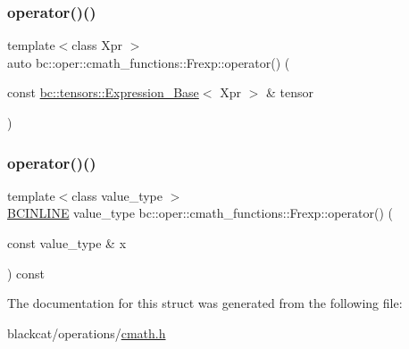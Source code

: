 \mbox{\label{structbc_1_1oper_1_1cmath__functions_1_1Frexp_aaba2f5528d6ad335863154f6976d800a}} 
\subsubsection{\texorpdfstring{operator()()}{operator()()}\hspace{0.1cm}{\footnotesize\ttfamily [2/3]}}
{\footnotesize\ttfamily template$<$class Xpr $>$ \\
auto bc\+::oper\+::cmath\+\_\+functions\+::\+Frexp\+::operator() (\begin{DoxyParamCaption}\item[{const \hyperlink{classbc_1_1tensors_1_1Expression__Base}{bc\+::tensors\+::\+Expression\+\_\+\+Base}$<$ Xpr $>$ \&}]{tensor }\end{DoxyParamCaption})\hspace{0.3cm}{\ttfamily [inline]}}

\mbox{\label{structbc_1_1oper_1_1cmath__functions_1_1Frexp_abc5bb0ebd00be03e1047030e0668ce18}} 
\subsubsection{\texorpdfstring{operator()()}{operator()()}\hspace{0.1cm}{\footnotesize\ttfamily [3/3]}}
{\footnotesize\ttfamily template$<$class value\+\_\+type $>$ \\
\hyperlink{common_8h_a6699e8b0449da5c0fafb878e59c1d4b1}{B\+C\+I\+N\+L\+I\+NE} value\+\_\+type bc\+::oper\+::cmath\+\_\+functions\+::\+Frexp\+::operator() (\begin{DoxyParamCaption}\item[{const value\+\_\+type \&}]{x }\end{DoxyParamCaption}) const\hspace{0.3cm}{\ttfamily [inline]}}



The documentation for this struct was generated from the following file\+:\begin{DoxyCompactItemize}
\item 
blackcat/operations/\hyperlink{cmath_8h}{cmath.\+h}\end{DoxyCompactItemize}
